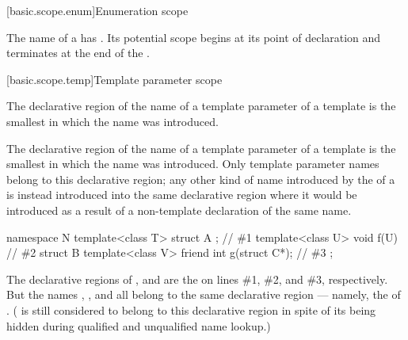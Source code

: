 [basic.scope.enum]{Enumeration scope}%
%

\pnum
The name of a  has
. Its potential scope begins at
its point of declaration and terminates at the end of the
.

[basic.scope.temp]{Template parameter scope}%
%
%

\pnum
The declarative region of the name of a template parameter of a template
 is the smallest 
in which the name was introduced.

\pnum
The declarative region of the name of a template parameter of a template is the smallest
 in which the name was introduced. Only template
parameter names belong to this declarative region; any other kind of name introduced by
the  of a  is instead
introduced into the same declarative region where it would be introduced as a result of
a non-template declaration of the same name.
\begin{example}
\begin{codeblock}
namespace N {
  template<class T> struct A { };               // \#1
  template<class U> void f(U) { }               // \#2
  struct B {
    template<class V> friend int g(struct C*);  // \#3
  };
}
\end{codeblock}
The declarative regions of ,  and  are the
 on lines \#1, \#2, and \#3,
respectively. But the names , ,  and  all belong to
the same declarative region --- namely, the  of .
( is still considered to belong to this declarative region in spite of its
being hidden during qualified and unqualified name lookup.)
\end{example}

